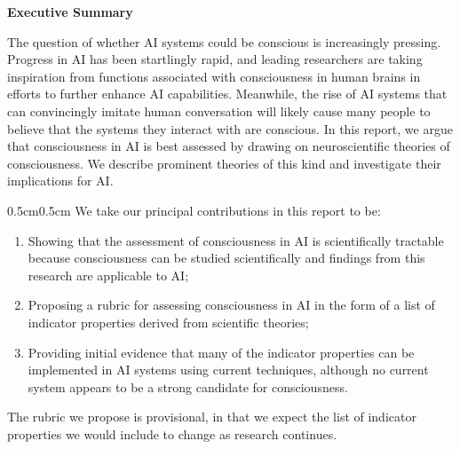 \documentclass[12pt]{article}
\newenvironment{executivesummarypage}
  {
   \noindent\LARGE \textbf{Executive Summary} \normalsize
   \vspace{1em}
   \par\noindent
  }
  {\newpage}
\begin{document}
\begin{executivesummarypage}\noindent The question of whether AI systems could be conscious is increasingly pressing. Progress in AI has been startlingly rapid, and leading researchers are taking inspiration from functions associated with consciousness in human brains in efforts to further enhance AI capabilities. Meanwhile, the rise of AI systems that can convincingly imitate human conversation will likely cause many people to believe that the systems they interact with are conscious.  In this report, we argue that consciousness in AI is best assessed by drawing on neuroscientific theories of consciousness. We describe prominent theories of this kind and investigate their implications for AI.

\begin{adjustwidth}{0.5cm}{0.5cm}
We take our principal contributions in this report to be:

\begin{enumerate}
    \item Showing that the assessment of consciousness in AI is scientifically tractable because consciousness can be studied scientifically and findings from this research are applicable to AI;
    \item Proposing a rubric for assessing consciousness in AI in the form of a list of indicator properties derived from scientific theories;
    \item Providing initial evidence that many of the indicator properties can be implemented in AI systems using current techniques, although no current system appears to be a strong candidate for consciousness.
\end{enumerate}
\end{adjustwidth}

\noindent The rubric we propose is provisional, in that we expect the list of indicator properties we would include to change as research continues. 


\end{executivesummarypage}
\end{document}
